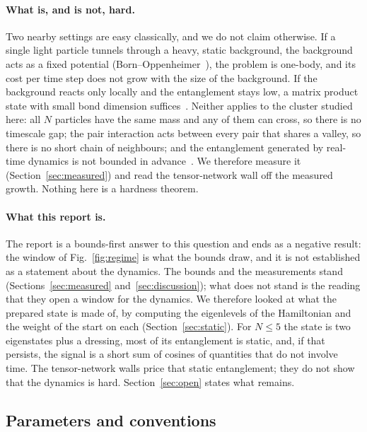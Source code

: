 \paragraph{What is, and is not, hard.}
Two nearby settings are easy classically, and we do not claim otherwise. If a single light particle tunnels through a
heavy, static background, the background acts as a fixed potential (Born--Oppenheimer~\cite{bornoppenheimer1927}), the
problem is one-body, and its cost per time step does not grow with the size of the background. If the background
reacts only locally and the entanglement stays low, a matrix product state with small bond dimension
suffices~\cite{vidal2004,schollwock2011,schuch2008}. Neither applies to the cluster studied here: all $N$ particles have
the same mass and any of them can cross, so there is no timescale gap; the pair interaction acts between every pair that
shares a valley, so there is no short chain of neighbours; and the entanglement generated by real-time dynamics is not
bounded in advance~\cite{calabrese2005}. We therefore measure it (Section~\ref{sec:measured}) and read the
tensor-network wall off the measured growth. Nothing here is a hardness theorem.

\paragraph{What this report is.}
The report is a bounds-first answer to this question and ends as a negative result: the window of Fig.~\ref{fig:regime} is what the bounds draw, and it is not established as a statement about the dynamics. The bounds and the measurements stand
(Sections~\ref{sec:measured} and~\ref{sec:discussion}); what does not stand is the reading that they open a window for the dynamics.
We therefore looked at what the prepared state is made of, by computing the eigenlevels of the Hamiltonian and the weight of the
start on each (Section~\ref{sec:static}). For $N\le5$ the state is two eigenstates plus a dressing, most of its entanglement
is static, and, if that persists, the signal is a short sum of cosines of quantities that do not involve time. The tensor-network walls price that static entanglement; they do not show that the dynamics is hard. Section~\ref{sec:open} states what remains.

\subsection{Parameters and conventions}
\label{sec:params}

